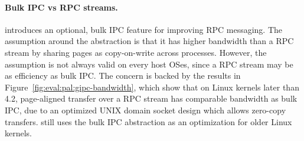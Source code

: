 \paragraph{Bulk IPC vs RPC streams.}
\Thehostabi{} introduces an optional, bulk IPC feature for improving RPC messaging.
The assumption around the
abstraction
is that it has higher bandwidth
than a RPC stream
by sharing pages as copy-on-write across processes.
However,
the assumption is not always valid
on every host OSes, since a RPC stream
may be as efficiency as bulk IPC.
The concern is backed by the
results
in Figure~\ref{fig:eval:pal:gipc-bandwidth},
which show that
on Linux kernels later than 4.2,
page-aligned transfer over a RPC stream has comparable bandwidth as bulk IPC,
due to an optimized UNIX domain socket design which allows zero-copy transfers.
\graphene{} still uses the bulk IPC abstraction
as an optimization
for older Linux kernels. 






 




